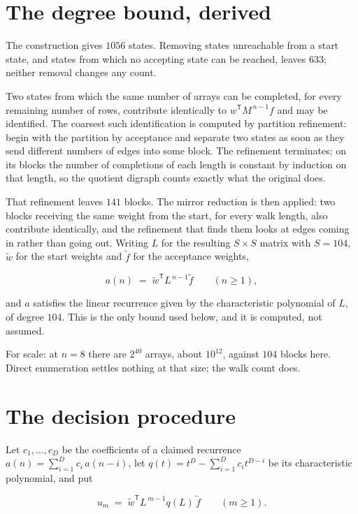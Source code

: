 \documentclass[11pt]{article}
\theoremstyle{definition}
\begin{document}
\section{The degree bound, derived}

The construction gives $1056$ states. Removing states unreachable from a start state, and states from which no accepting state can be reached, leaves $633$; neither removal changes any count.

Two states from which the same number of arrays can be completed, for every remaining number of rows, contribute identically to $w^{\mathsf T}M^{\,n-1}f$ and may be identified. The coarsest such identification is computed by partition refinement: begin with the partition by acceptance and separate two states as soon as they send different numbers of edges into some block. The refinement terminates; on its blocks the number of completions of each length is constant by induction on that length, so the quotient digraph counts exactly what the original does.

That refinement leaves $141$ blocks. The mirror reduction is then applied: two blocks receiving the same weight from the start, for every walk length, also contribute identically, and the refinement that finds them looks at edges coming in rather than going out. Writing $L$ for the resulting $S \times S$ matrix with $S = 104$, $\tilde w$ for the start weights and $\tilde f$ for the acceptance weights,

\[a(n) \;=\; \tilde w^{\mathsf T} L^{\,n-1} \tilde f \qquad (n \ge 1),\]

and $a$ satisfies the linear recurrence given by the characteristic polynomial of $L$, of degree $104$. This is the only bound used below, and it is computed, not assumed.

For scale: at $n = 8$ there are $2^{40}$ arrays, about $10^{12}$, against $104$ blocks here. Direct enumeration settles nothing at that size; the walk count does.

\section{The decision procedure}

Let $c_1,\dots,c_D$ be the coefficients of a claimed recurrence $a(n) = \sum_{i=1}^{D} c_i\,a(n-i)$, let $q(t) = t^{D} - \sum_{i=1}^{D} c_i t^{D-i}$ be its characteristic polynomial, and put

\[u_m \;=\; \tilde w^{\mathsf T} L^{\,m-1} q(L)\,\tilde f \qquad (m \ge 1).\]
\end{document}
